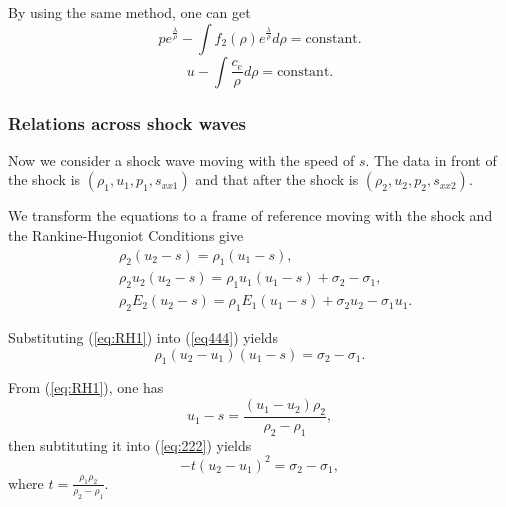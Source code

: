 \documentclass{article}
\numberwithin{equation}{section}
\numberwithin{table}{section}
\begin{document}
By using the same method, one can get
\begin{equation}\label{eq:prhoER}
  p e^{\frac{\lambda}{\rho}} - \int f_2(\rho) e^{\frac{\lambda}{\rho}}d\rho = \text{constant}.
\end{equation}
\begin{equation}\label{eq:urhoER}
  u-\int\frac{c_e}{\rho} d\rho = \text{constant}.
\end{equation}

\subsubsection{Relations across  shock waves}\label{sec:shock}
Now we consider a shock wave moving with the speed of $s$. The data in front of the shock is $(\rho_1,u_1,p_1,s_{xx1})$ and that after the shock is $(\rho_2,u_2,p_2,s_{xx2})$.

We transform the equations  to a frame of reference moving with the shock and the Rankine-Hugoniot Conditions give
\begin{align}
\label{eq:RH1}
  &\rho_2(u_2-s) = \rho_1(u_1-s), \\
\label{eq444}
  &\rho_2u_2(u_2-s) = \rho_1u_1(u_1-s)+\sigma_2-\sigma_1,\\
\label{eq:RH3}
  &\rho_2E_2(u_2-s) = \rho_1E_1(u_1-s)+\sigma_2 u_2-\sigma_1u_1.
\end{align}

Substituting (\ref{eq:RH1}) into (\ref{eq444}) yields
\begin{equation}\label{eq:222}
  \rho_1(u_2-u_1)(u_1-s) = \sigma_2-\sigma_1.
\end{equation}

From (\ref{eq:RH1}), one has
\begin{equation}
  u_1-s = \frac{(u_1 - u_2)\rho_2}{\rho_2 -\rho_1},
\end{equation}
then subtituting it into (\ref{eq:222}) yields
\begin{equation}\label{eq:u2u1}
  -t(u_2-u_1)^2 = \sigma_2-\sigma_1,
\end{equation}
where $ t=\frac{\rho_1 \rho_2}{\rho_2-\rho_1}$.
\end{document}
